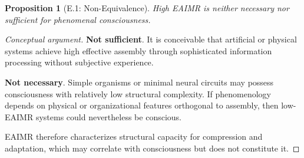 \documentclass[11pt,letterpaper]{article}
\newtheorem{proposition}{Proposition}
\begin{document}
\begin{proposition}[E.1: Non-Equivalence]
High EAIMR is neither necessary nor sufficient for phenomenal consciousness.
\end{proposition}

\begin{proof}[Conceptual argument]
\textbf{Not sufficient}. It is conceivable that artificial or physical systems achieve high effective assembly through sophisticated information processing without subjective experience.

\textbf{Not necessary}. Simple organisms or minimal neural circuits may possess consciousness with relatively low structural complexity. If phenomenology depends on physical or organizational features orthogonal to assembly, then low-EAIMR systems could nevertheless be conscious.

EAIMR therefore characterizes structural capacity for compression and adaptation, which may correlate with consciousness but does not constitute it.
\end{proof}
\end{document}
